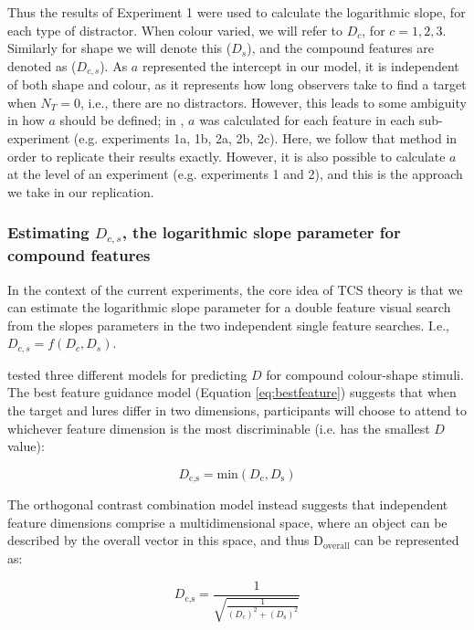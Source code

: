 \documentclass[smallextended, natbib]{svjour3}       %
\begin{document}
Thus the results of Experiment 1 were used to calculate the logarithmic slope, for each type of distractor. When colour varied, we will refer to $D_c$, for $c=1,2,3$. Similarly for shape we will denote this ($D_s$), and the compound features are denoted as ($D_{c,s}$). As $a$ represented the intercept in our model, it is independent of both shape and colour, as it represents how long observers take to find a target when $N_T = 0$, i.e., there are no distractors. However, this leads to some ambiguity in how $a$ should be defined; in \cite{buetti2019predicting}, $a$ was calculated for each feature in each sub-experiment (e.g. experiments 1a, 1b, 2a, 2b, 2c). Here, we follow that method in order to replicate their results exactly. However, it is also possible to calculate $a$ at the level of an experiment (e.g. experiments 1 and 2), and this is the approach we take in our replication.

\subsubsection{Estimating $D_{c,s}$, the logarithmic slope parameter for compound features}

In the context of the current experiments, the core idea of TCS theory is that we can estimate the logarithmic slope parameter for a double feature visual search from the slopes parameters in the two independent single feature searches. I.e., $D_{c,s} = f(D_c, D_s)$.

\cite{buetti2019predicting} tested three different models for predicting $D$ for compound colour-shape stimuli. The best feature guidance model (Equation \ref{eq:bestfeature}) suggests that when the target and lures differ in two dimensions, participants will choose to attend to whichever feature dimension is the most discriminable (i.e. has the smallest $D$ value):

\begin{equation}
D_\text{c,s} = \text{min}\left(D_\text{c}, D_\text{s}\right)
\label{eq:bestfeature}
\end{equation}

The orthogonal contrast combination model instead suggests that independent feature dimensions comprise a multidimensional space, where an object can be described by the overall vector in this space, and thus $\mathrm{D_{overall}}$ can be represented as:

\begin{equation}
D_\text{c,s} = \frac{1}{\sqrt{\frac{1}{(D_\text{c})^2 + (D_\text{s})^2}}}
\label{eq:orthogonalcontrast}
\end{equation}
\end{document}
